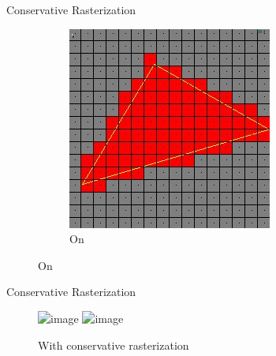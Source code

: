 \documentclass[10pt]{beamer}
\begin{document}
\begin{frame}{Conservative Rasterization}
\begin{figure}
\begin{subfigure}[t]{0.4\textwidth}
      \includegraphics[width=\textwidth]{conservativeraster_on}
      \caption*{On}
    \end{subfigure}
  \end{figure}
\end{frame}

\begin{frame}{Conservative Rasterization}

  \begin{figure}
    \includegraphics<1>[width=\textwidth]{voxels_off}
    \includegraphics<2>[width=\textwidth]{voxels_msaa}
    \caption*{With conservative rasterization}
  \end{figure}
\end{frame}
\end{document}
